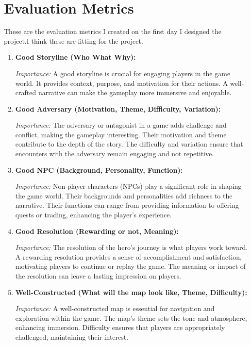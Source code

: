 \documentclass[10pt,twocolumn]{article}
\begin{document}
\section{Evaluation Metrics}

These are the evaluation metrics I created on the first day I designed the project.I think these are fitting for the project.

\begin{enumerate}
    \item \textbf{Good Storyline (Who What Why):}
    
    \textit{Importance:} A good storyline is crucial for engaging players in the game world. It provides context, purpose, and motivation for their actions. A well-crafted narrative can make the gameplay more immersive and enjoyable.\cite{reddit_dnd_campaign_fun}
    
    \item \textbf{Good Adversary (Motivation, Theme, Difficulty, Variation):}
    
    \textit{Importance:} The adversary or antagonist in a game adds challenge and conflict, making the gameplay interesting. Their motivation and theme contribute to the depth of the story. The difficulty and variation ensure that encounters with the adversary remain engaging and not repetitive.\cite{reddit_dnd_campaign_fun}
    
    \item \textbf{Good NPC (Background, Personality, Function):}
    
    \textit{Importance:} Non-player characters (NPCs) play a significant role in shaping the game world. Their backgrounds and personalities add richness to the narrative. Their functions can range from providing information to offering quests or trading, enhancing the player's experience.\cite{reddit_dnd_campaign_fun}
    
    \item \textbf{Good Resolution (Rewarding or not, Meaning):}
    
    \textit{Importance:} The resolution of the hero's journey is what players work toward. A rewarding resolution provides a sense of accomplishment and satisfaction, motivating players to continue or replay the game. The meaning or impact of the resolution can leave a lasting impression on players.\cite{reddit_dmacademy_oneshot}
    
    \item \textbf{Well-Constructed (What will the map look like, Theme, Difficulty):}
    
    \textit{Importance:} A well-constructed map is essential for navigation and exploration within the game. The map's theme sets the tone and atmosphere, enhancing immersion. Difficulty ensures that players are appropriately challenged, maintaining their interest.\cite{reddit_dmacademy_oneshot}
\end{enumerate}
\end{document}
